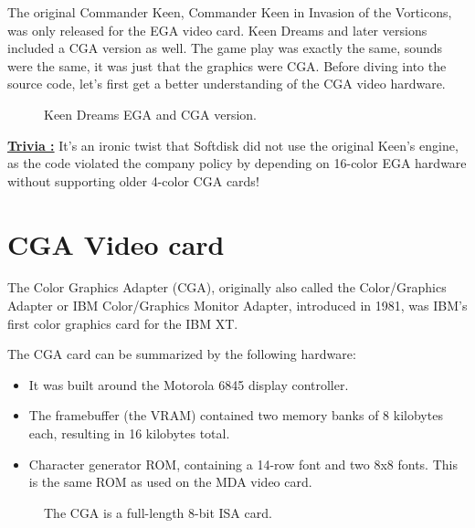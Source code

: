 \documentclass[book.tex]{subfiles}
\begin{document}
The original Commander Keen, Commander Keen in Invasion of the Vorticons, was only released for the EGA video card. Keen Dreams and later versions included a CGA version as well. The game play was exactly the same, sounds were the same, it was just that the graphics were CGA. Before diving into  the source code, let's first get a better understanding of the CGA video hardware.\\


\begin{figure}[H] 
  \centering 
  \caption{Keen Dreams EGA and CGA version.}
\end{figure}

\par
\textbf{\underline{Trivia :}} It's an ironic twist that Softdisk did not use the original Keen's engine, as the code violated the company policy by depending on 16-color EGA hardware without supporting older 4-color CGA cards!\\
\par


 

\section{CGA Video card}
The Color Graphics Adapter (CGA), originally also called the Color/Graphics Adapter or IBM Color/Graphics Monitor Adapter, introduced in 1981, was IBM's first color graphics card for the IBM XT.\\
\par
The CGA card can be summarized by the following hardware:
\begin{itemize}
  \item It was built around the Motorola 6845 display controller.
  \item The framebuffer (the VRAM) contained two memory banks of 8 kilobytes each, resulting in 16 kilobytes total.
  \item Character generator ROM, containing a 14-row font and two 8x8 fonts. This is the same ROM as used on the MDA video card.
\end{itemize}

\begin{figure}[H] 
  \centering 
  \caption{The CGA is a full-length 8-bit ISA card.}
\end{figure}
\end{document}
